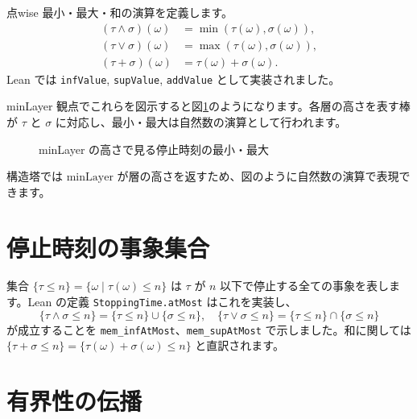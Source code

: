 \documentclass[12pt]{ltjsarticle}
\theoremstyle{definition}
\theoremstyle{plain}
\begin{document}
点wise 最小・最大・和の演算を定義します。
\begin{align*}
  (\tau\wedge\sigma)(\omega) &= \min(\tau(\omega),\sigma(\omega)),\\
  (\tau\vee\sigma)(\omega) &= \max(\tau(\omega),\sigma(\omega)),\\
  (\tau+\sigma)(\omega) &= \tau(\omega)+\sigma(\omega).
\end{align*}
Lean では \texttt{infValue}, \texttt{supValue}, \texttt{addValue} として実装されました。

minLayer 観点でこれらを図示すると図\ref{fig:lattice}のようになります。各層の高さを表す棒が $\tau$ と $\sigma$ に対応し、最小・最大は自然数の演算として行われます。

\begin{figure}[h]
  \centering
  \caption{minLayer の高さで見る停止時刻の最小・最大}
  \label{fig:lattice}
\end{figure}

構造塔では $\mathrm{minLayer}$ が層の高さを返すため、図のように自然数の演算で表現できます。

\section{停止時刻の事象集合}

集合 $\{\tau\le n\} = \{\omega\mid \tau(\omega)\le n\}$ は $\tau$ が $n$ 以下で停止する全ての事象を表します。Lean の定義 \texttt{StoppingTime.atMost} はこれを実装し、
\[
  \{\tau\wedge\sigma \le n\} = \{\tau\le n\} \cup \{\sigma\le n\},\quad
  \{\tau\vee\sigma \le n\} = \{\tau\le n\} \cap \{\sigma\le n\}
\]
が成立することを \texttt{mem\_infAtMost}、\texttt{mem\_supAtMost} で示しました。和に関しては $\{\tau+\sigma\le n\}=\{\tau(\omega)+\sigma(\omega)\le n\}$ と直訳されます。

\section{有界性の伝播}
\end{document}
